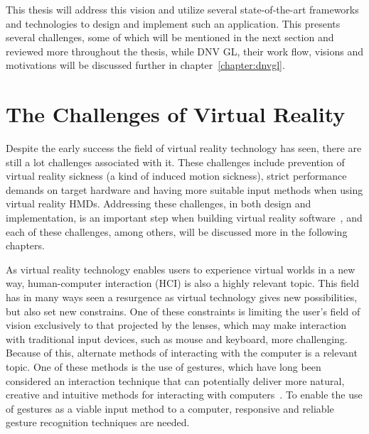 This thesis will address this vision and utilize several state-of-the-art frameworks and technologies to design and implement such 
an application. This presents several challenges, some of which will be mentioned in the next section and reviewed more throughout the thesis, while 
DNV GL, their work flow, visions and motivations will be discussed further in chapter~\ref{chapter:dnvgl}. 


\section{The Challenges of Virtual Reality} 
Despite the early success the field of virtual reality technology has seen, there are still a lot challenges associated with it. 
These challenges include prevention of virtual reality sickness (a kind of induced motion sickness), 
strict performance demands on target hardware and having more suitable input methods when using virtual reality HMDs. %
Addressing these challenges, in both design and implementation, is an important step when building virtual reality software~\citep{OCULUS2016}, 
and each of these challenges, among others, will be discussed more in the following chapters.

As virtual reality technology enables users to experience virtual worlds in a new way, 
human-computer interaction (HCI) is also a highly relevant topic. 
This field has in many ways seen a resurgence as virtual technology gives new possibilities, but also set new constrains. 
One of these constraints is limiting the user's field of vision exclusively to that projected by the lenses, 
which may make interaction with traditional input devices, such as mouse and keyboard, more challenging. 
Because of this, alternate methods of interacting with the computer is a relevant topic. 
One of these methods is the use of gestures, 
which have long been considered an interaction technique that can potentially deliver more natural, 
creative and intuitive methods for interacting with computers~\citep{Rautaray2015}. 
To enable the use of gestures as a viable input method to a computer, responsive and reliable gesture recognition techniques are needed.  

